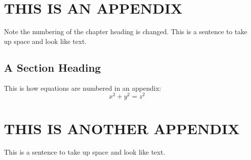 \documentclass{thesis}
\begin{document}
%
%
%
%
%
%
%
%
%


\appendix    %
\chapter{THIS IS AN APPENDIX}
Note the numbering of the chapter heading is changed.
This is a sentence to take up space and look like text.
\section{A Section Heading}
This is how equations are numbered in an appendix:
\begin{equation}
x^2 + y^2 = z^2
\end{equation} 

\chapter{THIS IS ANOTHER APPENDIX}
This is a sentence to take up space and look like text.
\end{document}
